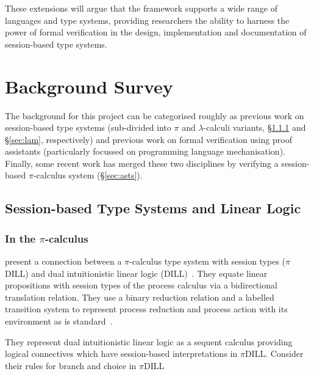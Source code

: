 \documentclass{mprop}
\newcommand{\1}{\textbf{1}\xspace}
\begin{document}
These extensions will argue that the framework supports a wide range of languages and type systems, providing researchers the ability to harness the power of formal verification in the design, implementation and documentation of session-based type systems.

\section{Background Survey}


The background for this project can be categorised roughly as previous work on session-based type systems (sub-divided into $\pi$ and $\lambda$-calculi variants, \S \ref{sec:pis} and \S \ref{sec:lam}, respectively) and previous work on formal verification using proof assistants (particularly focussed on programming language mechanisation). Finally, some recent work has merged these two disciplines by verifying a session-based $\pi$-calculus system (\S \ref{sec:asts}).

\subsection{Session-based Type Systems and Linear Logic}\label{sec:sts}

\subsubsection{In the \texorpdfstring{$\pi$}{pi}-calculus}\label{sec:pis}

\citeauthor{Caires:2010:STI} \cite{Caires:2010:STI} present a connection between a $\pi$-calculus type system with session types ($\pi$DILL) and dual intuitionistic linear logic (DILL)~\cite{Barber:1996}. They equate linear propositions with session types of the process calculus via a bidirectional translation relation. They use a binary reduction relation and a labelled transition system to represent process reduction and process action with its environment as is standard~\cite{Sangiorgi:2001}.

They represent dual intuitionistic linear logic as a sequent calculus providing logical connectives which have session-based interpretations in $\pi$DILL. Consider their rules for branch and choice in $\pi$DILL
\end{document}
